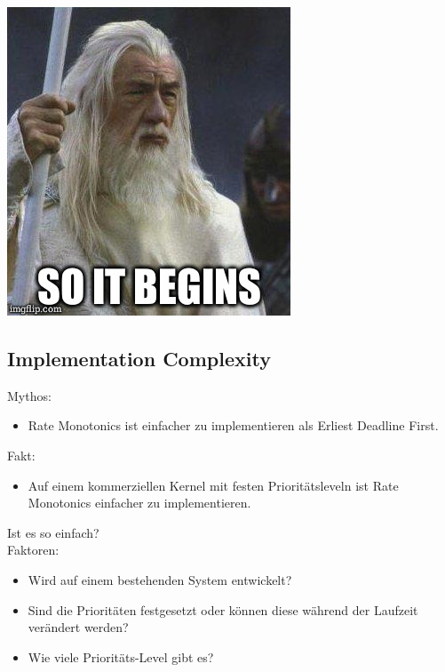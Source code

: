 \begin{frame}{\secname}
	\begin{center}
			\includegraphics[scale=0.5]{graphics/memes/gandalf.jpg}
	\end{center}
\end{frame}

\subsection{Implementation Complexity}\label{ImplementationComplexity}
\begin{frame}{\subsecname}
	Mythos:
	\begin{itemize}
		\item Rate Monotonics ist einfacher zu implementieren als Erliest Deadline First.
	\end{itemize}
\end{frame}

\begin{frame}{\subsecname}
	Fakt:
	\begin{itemize}
		\item Auf einem kommerziellen Kernel mit festen Prioritätsleveln ist Rate Monotonics einfacher zu implementieren.
	\end{itemize}
	Ist es so einfach?\\\pause
	Faktoren:
	\begin{itemize}
		\item Wird auf einem bestehenden System entwickelt?
		\item Sind die Prioritäten festgesetzt oder können diese während der Laufzeit verändert werden?
		\item Wie viele Prioritäts-Level gibt es?
	\end{itemize}
\end{frame}

